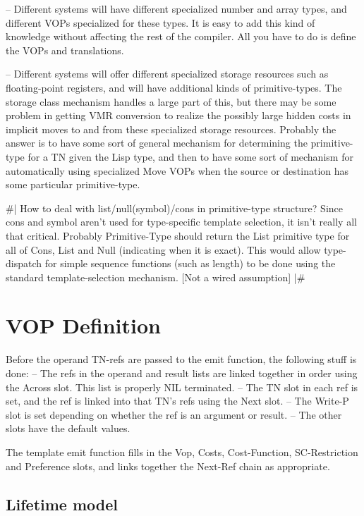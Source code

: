  -- Different systems will have different specialized number and array types,
    and different VOPs specialized for these types.  It is easy to add this kind
    of knowledge without affecting the rest of the compiler.  All you have to
    do is define the VOPs and translations.

 -- Different systems will offer different specialized storage resources
    such as floating-point registers, and will have additional kinds of
    primitive-types.  The storage class mechanism handles a large part of this,
    but there may be some problem in getting VMR conversion to realize the
    possibly large hidden costs in implicit moves to and from these specialized
    storage resources.  Probably the answer is to have some sort of general
    mechanism for determining the primitive-type for a TN given the Lisp type,
    and then to have some sort of mechanism for automatically using specialized
    Move VOPs when the source or destination has some particular primitive-type.

\#|
How to deal with list/null(symbol)/cons in primitive-type structure?  Since
cons and symbol aren't used for type-specific template selection, it isn't
really all that critical.  Probably Primitive-Type should return the List
primitive type for all of Cons, List and Null (indicating when it is exact).
This would allow type-dispatch for simple sequence functions (such as length)
to be done using the standard template-selection mechanism.  [Not a wired
assumption] 
|\#


\chapter{VOP Definition}

Before the operand TN-refs are passed to the emit function, the following
stuff is done:
 -- The refs in the operand and result lists are linked together in order using
    the Across slot.  This list is properly NIL terminated.
 -- The TN slot in each ref is set, and the ref is linked into that TN's refs
    using the Next slot.
 -- The Write-P slot is set depending on whether the ref is an argument or
    result.
 -- The other slots have the default values.

The template emit function fills in the Vop, Costs, Cost-Function,
SC-Restriction and Preference slots, and links together the Next-Ref chain as
appropriate.

\section{Lifetime model}

